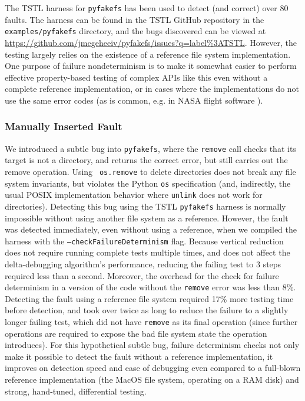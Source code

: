 The TSTL harness for {\tt pyfakefs} has been used to detect (and
correct) over 80 faults.  The harness can be found in the TSTL GitHub repository
in the {\tt examples/pyfakefs} directory, and the bugs discovered can
be viewed at \url{https://github.com/jmcgeheeiv/pyfakefs/issues?q=label%3ATSTL}.  However, the testing largely relies on
the existence of a reference file system implementation.  One purpose
of failure nondeterminism is to make it somewhat easier to perform effective
property-based testing of
complex APIs like this even without a complete reference implementation, or in cases
where the implementations do not use the same error
codes (as is common, e.g. in NASA flight software
\cite{ICSEDiff,CFV08}).

\subsubsection{Manually Inserted Fault}

We introduced a subtle bug into {\tt pyfakefs}, where the {\tt remove}
call checks that its target is not a directory, and returns the
correct error, but still carries out the remove operation.  Using {\tt
  os.remove} to delete directories does not break any file system
invariants, but violates the Python {\tt os} specification (and,
indirectly, the usual POSIX implementation behavior where {\tt unlink}
does not work for directories).  Detecting this bug using the TSTL
{\tt pyfakefs} harness is normally impossible without using another
file system as a reference.  However, the fault was detected
immediately, even without using a reference, when we compiled the harness
with the {\tt --checkFailureDeterminism} flag.  Because vertical
reduction does not require running complete tests multiple times, and
does not affect the delta-debugging algorithm's performance, reducing
the failing test to 3 steps required less than a second.
Moreover, the overhead for the check for failure determinism in a
version of the code without the {\tt remove} error was
less than 8\%.  Detecting the fault using a reference file system 
required 17\% more testing time before detection, and took over twice as
long to reduce the failure to a
slightly longer failing test, which did not have {\tt remove} as its
final operation (since further operations are required to 
expose the bad file system state the operation introduces).  For this
hypothetical subtle bug, failure determinism checks not only make it
possible to detect the fault without a reference implementation, it
improves on detection speed and ease of debugging even compared to a
full-blown reference implementation (the MacOS file system, operating
on a RAM disk) and strong, hand-tuned, differential testing.

